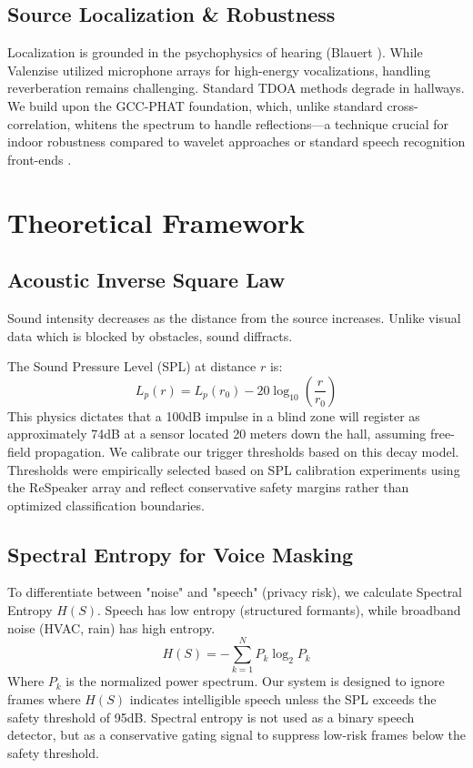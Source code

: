 \documentclass[conference]{IEEEtran}
\begin{document}
\subsection{Source Localization \& Robustness}
Localization is grounded in the psychophysics of hearing (Blauert \cite{b9}). While Valenzise \cite{b5} utilized microphone arrays for high-energy vocalizations, handling reverberation remains challenging. Standard TDOA methods degrade in hallways. We build upon the GCC-PHAT foundation, which, unlike standard cross-correlation, whitens the spectrum to handle reflections—a technique crucial for indoor robustness compared to wavelet approaches \cite{b10} or standard speech recognition front-ends \cite{b11}.

\section{Theoretical Framework}

\subsection{Acoustic Inverse Square Law}
Sound intensity decreases as the distance from the source increases. Unlike visual data which is blocked by obstacles, sound diffracts.

The Sound Pressure Level (SPL) at distance $r$ is:
\begin{equation}
L_p(r) = L_p(r_0) - 20 \log_{10}\left(\frac{r}{r_0}\right)
\end{equation}
This physics dictates that a 100dB impulse in a blind zone will register as approximately 74dB at a sensor located 20 meters down the hall, assuming free-field propagation. We calibrate our trigger thresholds based on this decay model. Thresholds were empirically selected based on SPL calibration experiments using the ReSpeaker array and reflect conservative safety margins rather than optimized classification boundaries.

\subsection{Spectral Entropy for Voice Masking}
To differentiate between "noise" and "speech" (privacy risk), we calculate Spectral Entropy $H(S)$. Speech has low entropy (structured formants), while broadband noise (HVAC, rain) has high entropy.
\begin{equation}
H(S) = -\sum_{k=1}^{N} P_k \log_2 P_k
\end{equation}
Where $P_k$ is the normalized power spectrum. Our system is designed to ignore frames where $H(S)$ indicates intelligible speech unless the SPL exceeds the safety threshold of 95dB. Spectral entropy is not used as a binary speech detector, but as a conservative gating signal to suppress low-risk frames below the safety threshold.
\end{document}
